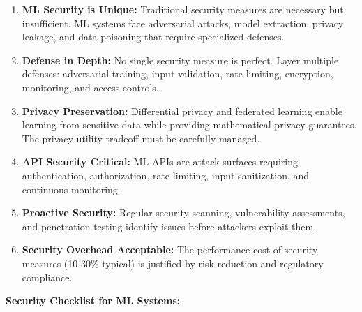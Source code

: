 \begin{enumerate}
    \item \textbf{ML Security is Unique:} Traditional security measures are necessary but insufficient. ML systems face adversarial attacks, model extraction, privacy leakage, and data poisoning that require specialized defenses.

    \item \textbf{Defense in Depth:} No single security measure is perfect. Layer multiple defenses: adversarial training, input validation, rate limiting, encryption, monitoring, and access controls.

    \item \textbf{Privacy Preservation:} Differential privacy and federated learning enable learning from sensitive data while providing mathematical privacy guarantees. The privacy-utility tradeoff must be carefully managed.

    \item \textbf{API Security Critical:} ML APIs are attack surfaces requiring authentication, authorization, rate limiting, input sanitization, and continuous monitoring.

    \item \textbf{Proactive Security:} Regular security scanning, vulnerability assessments, and penetration testing identify issues before attackers exploit them.

    \item \textbf{Security Overhead Acceptable:} The performance cost of security measures (10-30\% typical) is justified by risk reduction and regulatory compliance.
\end{enumerate}

\textbf{Security Checklist for ML Systems:}

